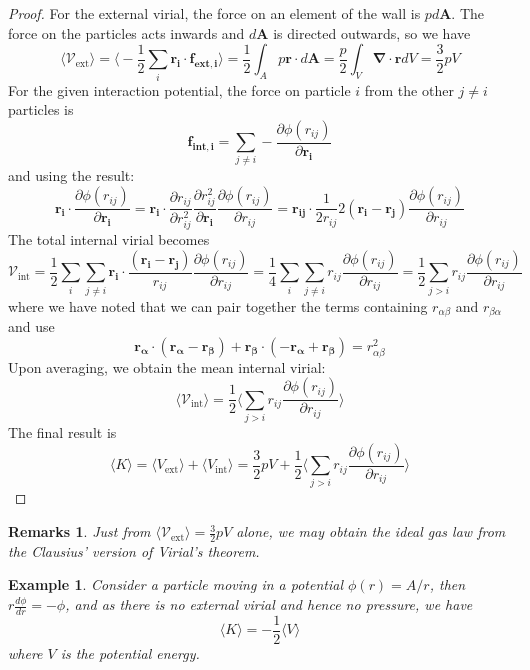 \documentclass[a4paper]{article}
\newtheorem{eg}{Example}[section]
\newtheorem{remarks}{Remarks}[section]
\theoremstyle{new}
\begin{document}
\begin{proof}
For the external virial, the force on an element of the wall is $pd\mathbf{A}$. The force on the particles acts inwards and $d\mathbf{A}$ is directed outwards, so we have
$$\langle\mathcal{V}_{\text{ext}}\rangle=\bigg\langle-\frac{1}{2}\sum_i\mathbf{r_i}\cdot\mathbf{f_{\text{ext},i}}\bigg\rangle=\frac{1}{2}\int_Ap\mathbf{r}\cdot d\mathbf{A}=\frac{p}{2}\int_V\boldsymbol{\nabla}\cdot\mathbf{r}dV=\frac{3}{2}pV$$
For the given interaction potential, the force on particle $i$ from the other $j\neq i$ particles is
$$\mathbf{f_{\text{int},i}}=\sum_{j\neq i}-\frac{\partial\phi(r_{ij})}{\partial\mathbf{r_i}}$$
and using the result:
$$\mathbf{r_i}\cdot\frac{\partial\phi(r_{ij})}{\partial\mathbf{r_i}}=\mathbf{r_i}\cdot\frac{\partial r_{ij}}{\partial r_{ij}^2}\frac{\partial r_{ij}^2}{\partial\mathbf{r_i}}\frac{\partial\phi(r_{ij})}{\partial r_{ij}}=\mathbf{r_{ij}}\cdot\frac{1}{2r_{ij}}2(\mathbf{r_i}-\mathbf{r_j})\frac{\partial\phi(r_{ij})}{\partial r_{ij}}$$
The total internal virial becomes
$$\mathcal{V}_{\text{int}}=\frac{1}{2}\sum_i\sum_{j\neq i}\mathbf{r_i}\cdot\frac{(\mathbf{r_i}-\mathbf{r_j})}{r_{ij}}\frac{\partial\phi(r_{ij})}{\partial r_{ij}}=\frac{1}{4}\sum_i\sum_{j\neq i}r_{ij}\frac{\partial\phi(r_{ij})}{\partial r_{ij}}=\frac{1}{2}\sum_{j>i}r_{ij}\frac{\partial\phi(r_{ij})}{\partial r_{ij}}$$
where we have noted that we can pair together the terms containing $r_{\alpha\beta}$ and $r_{\beta\alpha}$ and use
$$\mathbf{r_\alpha}\cdot(\mathbf{r_\alpha}-\mathbf{r_\beta})+\mathbf{r_\beta}\cdot(-\mathbf{r_\alpha}+\mathbf{r_\beta})=r_{\alpha\beta}^2$$
Upon averaging, we obtain the mean internal virial:
$$\langle\mathcal{V}_{\text{int}}\rangle=\frac{1}{2}\bigg\langle\sum_{j>i}r_{ij}\frac{\partial\phi(r_{ij})}{\partial r_{ij}}\bigg\rangle$$
The final result is
$$\langle K\rangle=\langle V_{\text{ext}}\rangle+\langle V_{\text{int}}\rangle=\frac{3}{2}pV+\frac{1}{2}\bigg\langle\sum_{j>i}r_{ij}\frac{\partial\phi(r_{ij})}{\partial r_{ij}}\bigg\rangle$$
\end{proof}
\begin{remarks}
Just from $\langle\mathcal{V}_{\text{ext}}\rangle=\frac{3}{2}pV$ alone, we may obtain the ideal gas law from the Clausius' version of Virial's theorem.
\end{remarks}
\begin{eg}
Consider a particle moving in a potential $\phi(r)=A/r$, then $r\frac{d\phi}{dr}=-\phi$, and as there is no external virial and hence no pressure, we have
$$\langle K\rangle=-\frac{1}{2}\langle V\rangle$$
where $V$ is the potential energy.
\end{eg}
\end{document}
